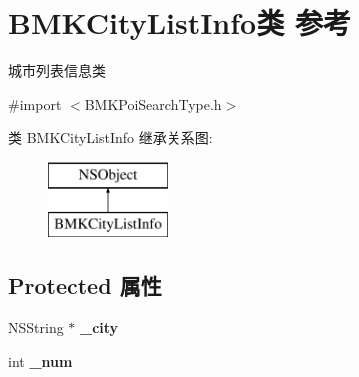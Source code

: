 \hypertarget{interface_b_m_k_city_list_info}{}\section{B\+M\+K\+City\+List\+Info类 参考}
\label{interface_b_m_k_city_list_info}


城市列表信息类  




{\ttfamily \#import $<$B\+M\+K\+Poi\+Search\+Type.\+h$>$}

类 B\+M\+K\+City\+List\+Info 继承关系图\+:\begin{figure}[H]
\begin{center}
\leavevmode
\includegraphics[height=2.000000cm]{interface_b_m_k_city_list_info}
\end{center}
\end{figure}
\subsection*{Protected 属性}
\begin{DoxyCompactItemize}
\item 
\hypertarget{interface_b_m_k_city_list_info_a868f1df35a24867c0957420506703225}{}N\+S\+String $\ast$ {\bfseries \+\_\+city}\label{interface_b_m_k_city_list_info_a868f1df35a24867c0957420506703225}

\item 
\hypertarget{interface_b_m_k_city_list_info_a0cc9abd0bfad17b52c924611f975db77}{}int {\bfseries \+\_\+num}\label{interface_b_m_k_city_list_info_a0cc9abd0bfad17b52c924611f975db77}

\end{DoxyCompactItemize}
